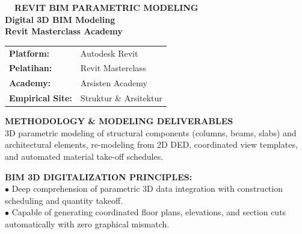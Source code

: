 \documentclass[10pt,a4paper,landscape]{article}
\begin{document}
\noindent
\begin{minipage}[t]{0.30\linewidth}
  \vspace{0pt}
  \begin{tcolorbox}[sharp corners, boxrule=0.8pt, colframe=pborder, colback=white, left=3mm, right=3mm, top=2.5mm, bottom=2.5mm, height=100mm]
    \colorbox{pred}{\fontsize{7pt}{8pt}\selectfont\bfseries\color{white}\ \ REVIT BIM PARAMETRIC MODELING\ \ }\\[1.5mm]
    {\fontsize{9.5pt}{11.5pt}\selectfont\bfseries\color{pnavy}Digital 3D BIM Modeling}\\[0.5mm]
    {\fontsize{7pt}{8.5pt}\selectfont\bfseries\color{pred}Revit Masterclass Academy}\\[2mm]

    \begin{tcolorbox}[sharp corners, boxrule=0.5pt, colframe=pborder, colback=pbglight, left=2mm, right=2mm, top=1.5mm, bottom=1.5mm]
      \begin{tabularx}{\linewidth}{@{}p{22mm} X@{}}
        {\fontsize{6.8pt}{8pt}\selectfont\bfseries Platform:} & {\fontsize{6.8pt}{8pt}\selectfont Autodesk Revit} \\[0.8mm]
        {\fontsize{6.8pt}{8pt}\selectfont\bfseries Pelatihan:} & {\fontsize{6.8pt}{8pt}\selectfont Revit Masterclass} \\[0.8mm]
        {\fontsize{6.8pt}{8pt}\selectfont\bfseries Academy:} & {\fontsize{6.8pt}{8pt}\selectfont Arsisten Academy} \\[0.8mm]
        {\fontsize{6.8pt}{8pt}\selectfont\bfseries Empirical Site:} & {\fontsize{6.8pt}{8pt}\selectfont Struktur \& Arsitektur}
      \end{tabularx}
    \end{tcolorbox}
    \vspace{1.5mm}

    {\fontsize{7.5pt}{9pt}\selectfont\bfseries\color{pnavy}METHODOLOGY \& MODELING DELIVERABLES}\\[0.8mm]
    {\fontsize{6.5pt}{8.2pt}\selectfont\color{psteel}
    3D parametric modeling of structural components (columns, beams, slabs) and architectural elements, re-modeling from 2D DED, coordinated view templates, and automated material take-off schedules.
    }
  \end{tcolorbox}
  \vspace{2mm}

  \begin{tcolorbox}[sharp corners, boxrule=0.6pt, colframe=pnavy, colback=pbglight, left=2.5mm, right=2.5mm, top=2mm, bottom=2mm, height=52mm]
    {\fontsize{7pt}{8.5pt}\selectfont\bfseries\color{pnavy}BIM 3D DIGITALIZATION PRINCIPLES:}\\[1.5mm]
    {\fontsize{6.5pt}{8.2pt}\selectfont\color{psteel}
    $\bullet$ Deep comprehension of parametric 3D data integration with construction scheduling and quantity takeoff.\\
    $\bullet$ Capable of generating coordinated floor plans, elevations, and section cuts automatically with zero graphical mismatch.
    }
  \end{tcolorbox}
\end{minipage}%
\end{document}
